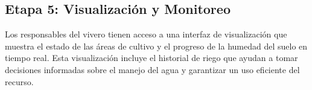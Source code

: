 \subsection*{Etapa 5: Visualización y Monitoreo}
Los responsables del vivero tienen acceso a una interfaz de visualización que muestra el estado de las áreas de cultivo y el progreso de la humedad del suelo en tiempo real. Esta visualización incluye el historial de riego que ayudan a tomar decisiones informadas sobre el manejo del agua y garantizar un uso eficiente del recurso.
